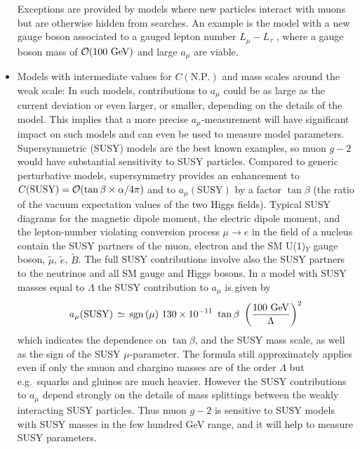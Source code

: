 \begin{itemize}
Exceptions are provided by models where new particles
interact with muons but are otherwise hidden from searches. An example
is the model with a new gauge boson associated to a gauged lepton
number $L_\mu-L_\tau$ \cite{LmuLtau}, where a gauge boson mass of
${\cal O}(100\mbox{ GeV})$ and large $a_\mu$ are viable.
\item Models with intermediate values for $C(\mbox{N.P.})$ and mass
  scales around the weak scale: In such
  models, contributions to $a_\mu$ could be as large as
  the current deviation or even larger, or smaller, depending on the
  details of the model. This implies that a more precise
  $a_\mu$-measurement will have significant impact on such models and
  can even be used to measure model parameters. Supersymmetric (SUSY) models
  are the best known examples, so muon $g-2$ would have substantial
  sensitivity to
 SUSY particles.
Compared to generic perturbative models,
supersymmetry provides an enhancement to $C(\mbox{SUSY})={\cal
  O}(\tan\beta\times\alpha/4\pi)$
and to $ a_\mu(\mbox{SUSY})$ by a factor $\tan\beta$ (the ratio of
the vacuum expectation values of the two Higgs fields). Typical SUSY
diagrams for the magnetic dipole moment, the electric dipole moment,
and the lepton-number violating conversion process $\mu \rightarrow
e$ in the field of a nucleus contain the SUSY partners of
the muon, electron and the SM U(1)$_Y$ gauge boson, $\tilde{\mu}$,
$\tilde{e}$, $\tilde{B}$. The full SUSY contributions involve also the
SUSY partners to the neutrinos and all SM gauge and Higgs bosons. In a
model with SUSY masses equal to $\Lambda$ 
the SUSY contribution to $a_{\mu}$ is given
by~\cite{czmar} \begin{equation} \label{amususy}
 a_{\mu}({\rm SUSY})\, \simeq \,{\rm sgn}\, (\mu) \ 130 \times 10^{-11}\ \tan \beta\
\left({100\ {\rm GeV}  \over \Lambda}\right)^2
\end{equation}
which indicates the dependence on $\tan \beta$,
and the SUSY mass scale,  as well as the sign of the
SUSY $\mu$-parameter. The formula still approximately applies even if
only the smuon and chargino masses are of the order $\Lambda$
but e.g.\ squarks and gluinos are much heavier. However the SUSY
contributions to $a_\mu$ depend strongly on the details of mass
splittings between the weakly interacting SUSY particles.
Thus muon $g-2$ is sensitive to  SUSY models with SUSY masses
in the few hundred GeV range, and it will help to measure SUSY
parameters. 


\end{itemize}
